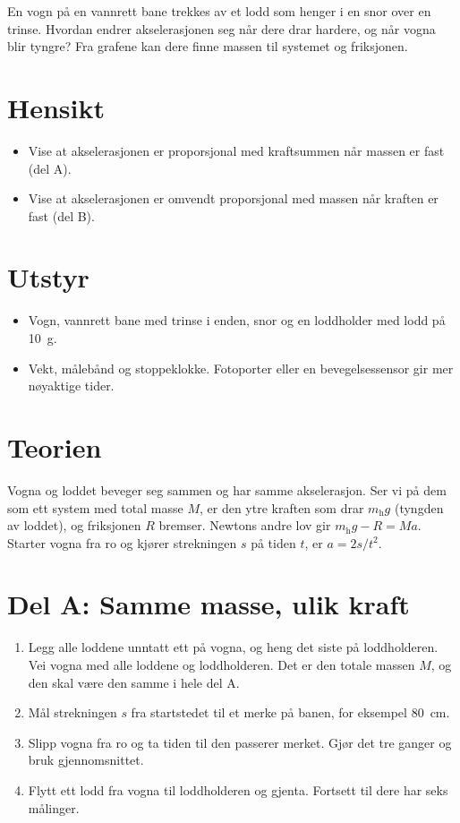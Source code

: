 \documentclass[11pt]{article}
\begin{document}

En vogn på en vannrett bane trekkes av et lodd som henger i en snor over en trinse. Hvordan endrer akselerasjonen seg når dere drar hardere, og når vogna blir tyngre? Fra grafene kan dere finne massen til systemet og friksjonen.

\section*{Hensikt}

\begin{itemize}
\item Vise at akselerasjonen er proporsjonal med kraftsummen når massen er fast (del A).
\item Vise at akselerasjonen er omvendt proporsjonal med massen når kraften er fast (del B).
\end{itemize}

\section*{Utstyr}

\begin{itemize}
\item Vogn, vannrett bane med trinse i enden, snor og en loddholder med lodd på 10~g.
\item Vekt, målebånd og stoppeklokke. Fotoporter eller en bevegelsessensor gir mer nøyaktige tider.
\end{itemize}

\section*{Teorien}

Vogna og loddet beveger seg sammen og har samme akselerasjon. Ser vi på dem som ett system med total masse $M$, er den ytre kraften som drar $m_{\mathrm{h}}g$ (tyngden av loddet), og friksjonen $R$ bremser. Newtons andre lov gir $m_{\mathrm{h}}g - R = Ma$. Starter vogna fra ro og kjører strekningen $s$ på tiden $t$, er $a = 2s/t^{2}$.

\section*{Del A: Samme masse, ulik kraft}

\begin{enumerate}
\item Legg alle loddene unntatt ett på vogna, og heng det siste på loddholderen. Vei vogna med alle loddene og loddholderen. Det er den totale massen $M$, og den skal være den samme i hele del A.
\item Mål strekningen $s$ fra startstedet til et merke på banen, for eksempel 80~cm.
\item Slipp vogna fra ro og ta tiden til den passerer merket. Gjør det tre ganger og bruk gjennomsnittet.
\item Flytt ett lodd fra vogna til loddholderen og gjenta. Fortsett til dere har seks målinger.
\end{enumerate}
\end{document}
